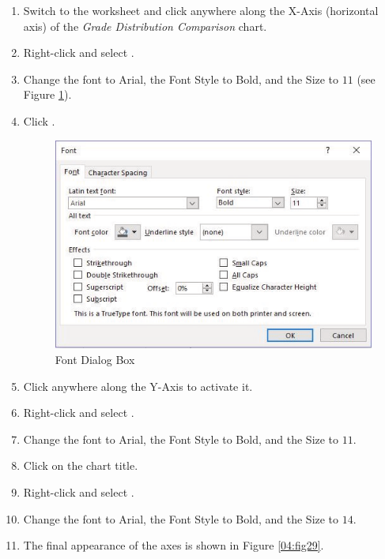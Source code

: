 \begin{enumbox}
	\begin{enumerate}
		\item Switch to the  worksheet and click anywhere along the X-Axis (horizontal axis) of the \textit{Grade Distribution Comparison} chart. 
		\item Right-click and select .
		\item Change the font to Arial, the Font Style to Bold, and the Size to $ 11 $ (see Figure \ref{04:fig28}).
		\item Click .
	
		\begin{figure}[H]
			\centering
			\includegraphics[width=\maxwidth{.95\linewidth}]{gfx/ch04_fig28}
			\caption{Font Dialog Box}
			\label{04:fig28}
		\end{figure}
	
		\item Click anywhere along the Y-Axis to activate it.
		\item Right-click and select .
		\item Change the font to Arial, the Font Style to Bold, and the Size to $ 11 $.
		\item Click on the chart title.
		\item Right-click and select .
		\item Change the font to Arial, the Font Style to Bold, and the Size to $ 14 $.
		\item The final appearance of the axes is shown in Figure \ref{04:fig29}.
	\end{enumerate}
\end{enumbox}
	
